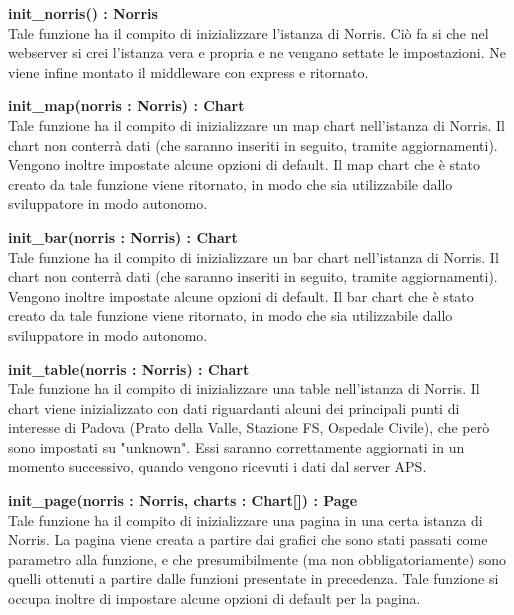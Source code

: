         \begin{description}

            \item \textbf{init\_norris() : Norris} \\
            Tale funzione ha il compito di inizializzare l'istanza di Norris. Ciò fa si che nel webserver si crei l'istanza vera e propria e ne vengano settate le impostazioni. Ne viene infine montato il middleware con express e ritornato.
            
            \item \textbf{init\_map(norris : Norris) : Chart} \\
            Tale funzione ha il compito di inizializzare un map chart nell'istanza di Norris. Il chart non conterrà dati (che saranno inseriti in seguito, tramite aggiornamenti). Vengono inoltre impostate alcune opzioni di default. Il map chart che è stato creato da tale funzione viene ritornato, in modo che sia utilizzabile dallo sviluppatore in modo autonomo.
            
            \item \textbf{init\_bar(norris : Norris) : Chart} \\
            Tale funzione ha il compito di inizializzare un bar chart nell'istanza di Norris. Il chart non conterrà dati (che saranno inseriti in seguito, tramite aggiornamenti). Vengono inoltre impostate alcune opzioni di default. Il bar chart che è stato creato da tale funzione viene ritornato, in modo che sia utilizzabile dallo sviluppatore in modo autonomo.
            
            \item \textbf{init\_table(norris : Norris) : Chart} \\
            Tale funzione ha il compito di inizializzare una table nell'istanza di Norris. Il chart viene inizializzato con dati riguardanti alcuni dei principali punti di interesse di Padova (Prato della Valle, Stazione FS, Ospedale Civile), che però sono impostati su "unknown". Essi saranno correttamente aggiornati in un momento successivo, quando vengono ricevuti i dati dal server APS.
            
            \item \textbf{init\_page(norris : Norris, charts : Chart[]) : Page} \\
            Tale funzione ha il compito di inizializzare una pagina in una certa istanza di Norris. La pagina viene creata a partire dai grafici che sono stati passati come parametro alla funzione, e che presumibilmente (ma non obbligatoriamente) sono quelli ottenuti a partire dalle funzioni presentate in precedenza. Tale funzione si occupa inoltre di impostare alcune opzioni di default per la pagina.
            

\end{description}
